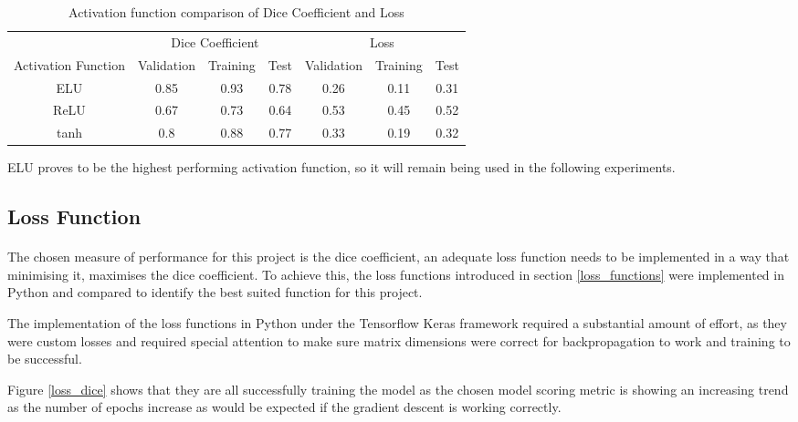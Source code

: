 \begin{table}[ht!]
    \begin{center}
    \begin{tabular}{ccccccc}
        \toprule
       & \multicolumn{3}{c}{Dice Coefficient}     & \multicolumn{3}{c}{Loss} \\
    Activation Function & Validation & Training & Test & Validation & Training & Test \\
    \rowcolor{lightgray} \gls{ELU} & 0.85 & 0.93 & 0.78 & 0.26 & 0.11 & 0.31  \\ \gls{ReLU} & 0.67 & 0.73 & 0.64 & 0.53 & 0.45 & 0.52  \\ tanh & 0.8 & 0.88 & 0.77 & 0.33 & 0.19 & 0.32  \\
                    \bottomrule
    \end{tabular}
    \caption{Activation function comparison of Dice Coefficient and Loss} \label{tab_act}
  \end{center}
\end{table}

\gls{ELU} proves to be the highest performing activation function, so it will remain being used in the following experiments.
\subsection{Loss Function} \label{loss_exp}
\paragraph{}
The chosen measure of performance for this project is the dice coefficient, an adequate loss function needs to be implemented in a way that minimising it, maximises the dice coefficient. To achieve this, the loss functions introduced in section \ref{loss_functions} were implemented in Python and compared to identify the best suited function for this project.

The implementation of the loss functions in Python under the Tensorflow Keras framework required a substantial amount of effort, as they were custom losses and required special attention to make sure matrix dimensions were correct for backpropagation to work and training to be successful. 

Figure \ref{loss_dice} shows that they are all successfully training the model as the chosen model scoring metric is showing an increasing trend as the number of epochs increase as would be expected if the gradient descent is working correctly.

